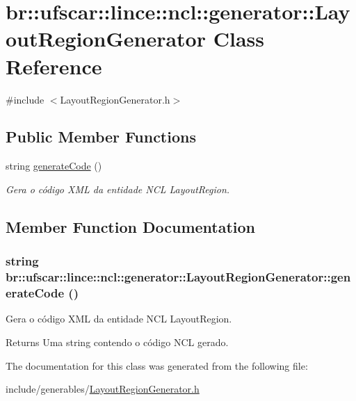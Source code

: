\hypertarget{classbr_1_1ufscar_1_1lince_1_1ncl_1_1generator_1_1LayoutRegionGenerator}{
\section{br::ufscar::lince::ncl::generator::LayoutRegionGenerator Class Reference}
\label{classbr_1_1ufscar_1_1lince_1_1ncl_1_1generator_1_1LayoutRegionGenerator}
}


{\ttfamily \#include $<$LayoutRegionGenerator.h$>$}

\subsection*{Public Member Functions}
\begin{DoxyCompactItemize}
\item 
string \hyperlink{classbr_1_1ufscar_1_1lince_1_1ncl_1_1generator_1_1LayoutRegionGenerator_a7b7164233cabca3a37a7cfbd3182d0cb}{generateCode} ()
\begin{DoxyCompactList}\small\item\em Gera o código XML da entidade NCL LayoutRegion. \item\end{DoxyCompactList}\end{DoxyCompactItemize}


\subsection{Member Function Documentation}
\hypertarget{classbr_1_1ufscar_1_1lince_1_1ncl_1_1generator_1_1LayoutRegionGenerator_a7b7164233cabca3a37a7cfbd3182d0cb}{
\subsubsection[{generateCode}]{\setlength{\rightskip}{0pt plus 5cm}string br::ufscar::lince::ncl::generator::LayoutRegionGenerator::generateCode ()}}
\label{classbr_1_1ufscar_1_1lince_1_1ncl_1_1generator_1_1LayoutRegionGenerator_a7b7164233cabca3a37a7cfbd3182d0cb}


Gera o código XML da entidade NCL LayoutRegion. 

\begin{DoxyReturn}{Returns}
Uma string contendo o código NCL gerado. 
\end{DoxyReturn}


The documentation for this class was generated from the following file:\begin{DoxyCompactItemize}
\item 
include/generables/\hyperlink{LayoutRegionGenerator_8h}{LayoutRegionGenerator.h}\end{DoxyCompactItemize}
